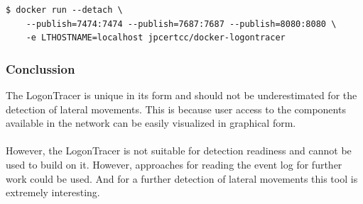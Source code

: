 \begin{lstlisting}[language=HTML,caption=LogonTracer: recommended docker run command]
    $ docker run --detach \
    --publish=7474:7474 --publish=7687:7687 --publish=8080:8080 \
    -e LTHOSTNAME=localhost jpcertcc/docker-logontracer
\end{lstlisting}
\subsubsection{Conclussion}
The LogonTracer is unique in its form and should not be underestimated for the detection of lateral movements. This is because user access to the components available in the network can be easily visualized in graphical form.
\\\\
However, the LogonTracer is not suitable for detection readiness and cannot be used to build on it. However, approaches for reading the event log for further work could be used. And for a further detection of lateral movements this tool is extremely interesting.

\clearpage

